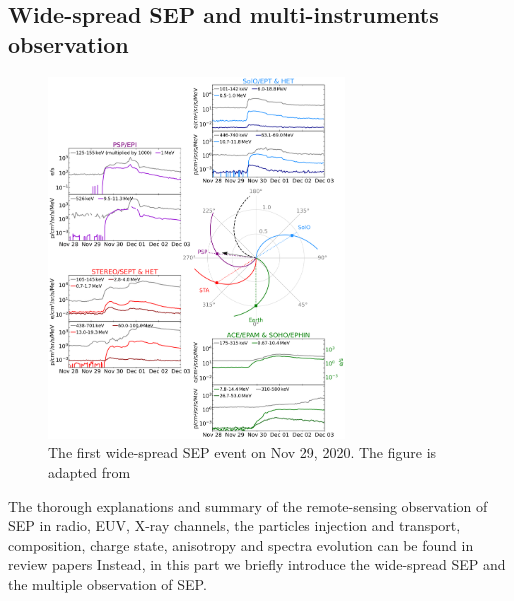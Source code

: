 \subsection{Wide-spread SEP and multi-instruments observation}


\begin{figure}[!htbp]
	\centering
	\includegraphics[width = 0.7\textwidth, height = 0.5\textheight]{images/2020-11-29_overview_plot.png}
	\caption{The first wide-spread \acl{SEP} event on Nov 29, 2020. The figure is adapted from \citet{Kollhoff-2021}}
	\label{Fig:SEP_widespread}
\end{figure}

The thorough explanations and summary of the remote-sensing observation of \ac{SEP} in radio, EUV, X-ray channels, the particles injection and transport, composition, charge state, anisotropy and spectra evolution can be found in review papers \citep{reames2013two, Desai_Diacalone2016LRSP, Reames2021LNP}
Instead, in this part we briefly introduce the wide-spread \ac{SEP} and the multiple observation of \ac{SEP}.

